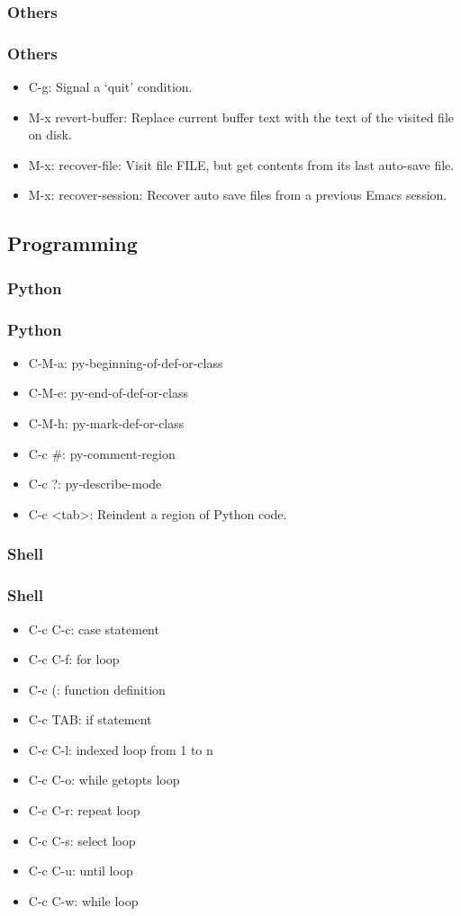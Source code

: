 \subsubsection{Others}
\begin{frame}
\frametitle{Others}
    \begin{itemize}
        \item C-g: Signal a `quit' condition.
        \item M-x revert-buffer: Replace current buffer text with the text of the visited file on disk.
        \item M-x: recover-file: Visit file FILE, but get contents from its last auto-save file.
        \item M-x: recover-session: Recover auto save files from a previous Emacs session.
    \end{itemize}
\end{frame}
\subsection{Programming}
\subsubsection{Python}
\begin{frame}
\frametitle{Python}
    \begin{itemize}
        \item C-M-a: py-beginning-of-def-or-class
        \item C-M-e: py-end-of-def-or-class
        \item C-M-h: py-mark-def-or-class
        \item C-c \#: py-comment-region
        \item C-c ?: py-describe-mode
        \item C-c <tab>: Reindent a region of Python code.
    \end{itemize}
\end{frame}
\subsubsection{Shell}
\begin{frame}
\frametitle{Shell}
    \begin{itemize}
        \item C-c C-c: case statement
        \item C-c C-f: for loop
        \item C-c (: function definition
        \item C-c TAB: if statement
        \item C-c C-l: indexed loop from 1 to n
        \item C-c C-o: while getopts loop
        \item C-c C-r: repeat loop
        \item C-c C-s: select loop
        \item C-c C-u: until loop
        \item C-c C-w: while loop
    \end{itemize}
\end{frame}
